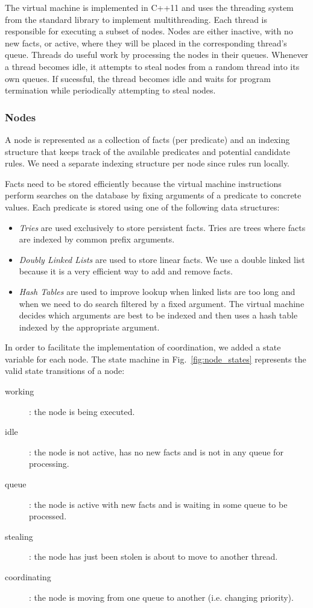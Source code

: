 The virtual machine is implemented in C++11 and uses the threading system from
the standard library to implement multithreading. Each thread is responsible
for executing a subset of nodes. Nodes are either inactive, with no new facts,
or active, where they will be placed in the corresponding thread's queue.
Threads do useful work by processing the nodes in their queues. Whenever a
thread becomes idle, it attempts to steal nodes from a random thread into its
own queues. If sucessful, the thread becomes idle and waits for program
termination while periodically attempting to steal nodes.

\subsubsection{Nodes}

A node is represented as a collection of facts (per predicate) and an indexing structure that
keeps track of the available predicates and potential candidate rules. We need
a separate indexing structure per node since rules run locally.

Facts need to be stored efficiently because the virtual machine instructions
perform searches on the database by fixing arguments of a predicate to concrete
values. Each predicate is stored using one of the following data structures:

\begin{itemize}
\item \emph{Tries} are used exclusively to store 
  persistent facts. Tries are trees where facts are indexed by common
  prefix arguments.
\item \emph{Doubly Linked Lists} are used to store 
  linear facts. We use a double linked list because it is a very
   efficient way to add and remove facts.
\item \emph{Hash Tables} are used to improve lookup when 
  linked lists are too long and when we need to do search filtered by
  a fixed argument. The virtual machine decides which arguments are
  best to be indexed and then uses a hash table
  indexed by the appropriate argument.
\end{itemize}

In order to facilitate the implementation of coordination, we added a state
variable for each node. The state machine in
Fig.~\ref{fig:node_states} represents the valid state transitions of a node:

\begin{description}
   \item[working]: the node is being executed.
   \item[idle]: the node is not active, has no new facts and is not in any
   queue for processing.
   \item[queue]: the node is active with new facts and is waiting in some queue
   to be processed.
   \item[stealing]: the node has just been stolen is about to move to another
   thread.
   \item[coordinating]: the node is moving from one queue to another (i.e.
         changing priority).
\end{description}

